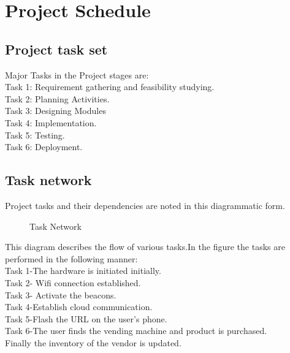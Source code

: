 \documentclass[oneside,a4paper,12pt]{report}
\begin{document}
\section{Project Schedule}  
\subsection{Project task set}  
Major Tasks in the Project stages are:\\
Task 1: Requirement gathering and feasibility studying.\\
Task 2: Planning Activities.\\
Task 3: Designing Modules\\
Task 4: Implementation. \\
Task 5: Testing.\\
Task 6: Deployment.\\

\subsection{Task network}  
Project tasks and their dependencies are noted in this diagrammatic form.
\begin{center}
	\begin{figure}[!htbp]
		\centering
	  \caption{Task Network}
	  \label{fig:act-dig}
	\end{figure}
\end{center}  
This diagram describes the flow of various tasks.In the figure the tasks are performed in the following manner:\\
Task 1-The hardware is initiated initially.\\
Task 2- Wifi connection established.\\
Task 3- Activate the beacons.\\
Task 4-Establish cloud communication.\\
Task 5-Flash the URL on the user's phone.\\
Task 6-The user finds the vending machine and product is purchased.\\
Finally the inventory of the vendor is updated.\\
\newpage
\end{document}
